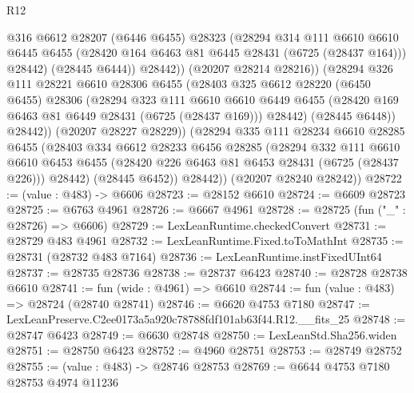 \begin{lexlean}{R12}
\begin{coremodule}
                    @316
                    @6612
                    @28207
                    (@6446 @6455)
                    @28323
                    (@28294
                      @314
                      @111
                      @6610
                      @6610
                      @6445
                      @6455
                      (@28420 @164 @6463 @81 @6445 @28431 (@6725 (@28437 @164)))
                      @28442)
                    (@28445 @6444))
                  @28442))
              (@20207 @28214 @28216))
            (@28294
              @326
              @111
              @28221
              @6610
              @28306
              @6455
              (@28403
                @325
                @6612
                @28220
                (@6450 @6455)
                @28306
                (@28294
                  @323
                  @111
                  @6610
                  @6610
                  @6449
                  @6455
                  (@28420 @169 @6463 @81 @6449 @28431 (@6725 (@28437 @169)))
                  @28442)
                (@28445 @6448))
              @28442))
          (@20207 @28227 @28229))
        (@28294
          @335
          @111
          @28234
          @6610
          @28285
          @6455
          (@28403
            @334
            @6612
            @28233
            @6456
            @28285
            (@28294
              @332
              @111
              @6610
              @6610
              @6453
              @6455
              (@28420 @226 @6463 @81 @6453 @28431 (@6725 (@28437 @226)))
              @28442)
            (@28445 @6452))
          @28442))
      (@20207 @28240 @28242))
@28722 := (value : @483) -> @6606
@28723 := @28152 @6610
@28724 := @6609 @28723
@28725 := @6763 @4961
@28726 := @6667 @4961
@28728 := @28725 (fun ("_" : @28726) => @6606)
@28729 := LexLeanRuntime.checkedConvert
@28731 := @28729 @483 @4961
@28732 := LexLeanRuntime.Fixed.toToMathInt
@28735 := @28731 (@28732 @483 @7164)
@28736 := LexLeanRuntime.instFixedUInt64
@28737 := @28735 @28736
@28738 := @28737 @6423
@28740 := @28728 @28738 @6610
@28741 := fun (wide : @4961) => @6610
@28744 := fun (value : @483) => @28724 (@28740 @28741)
@28746 := @6620 @4753 @7180
@28747 := LexLeanPreserve.C2ee0173a5a920c78788fdf101ab63f44.R12.__fits_25
@28748 := @28747 @6423
@28749 := @6630 @28748
@28750 := LexLeanStd.Sha256.widen
@28751 := @28750 @6423
@28752 := @4960 @28751
@28753 := @28749 @28752
@28755 := (value : @483) -> @28746 @28753
@28769 := @6644
    @4753
    @7180
    @28753
    @4974
    @11236

\end{coremodule}
\end{lexlean}
